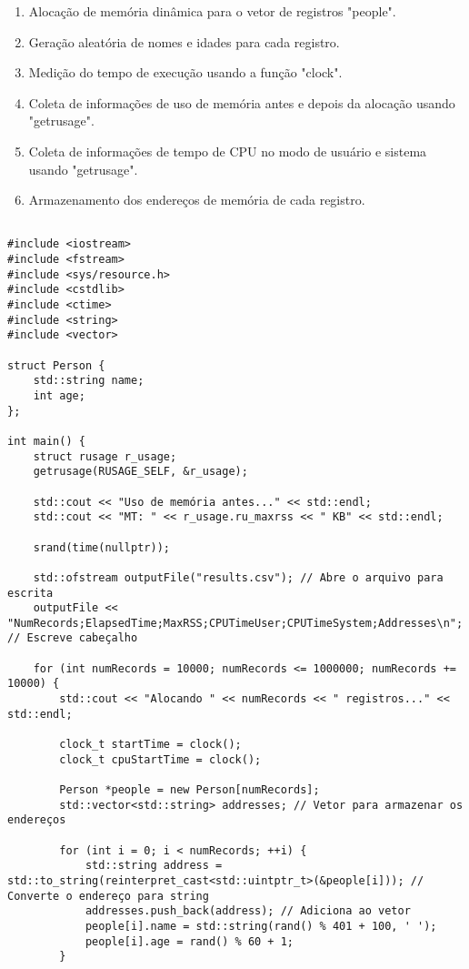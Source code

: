 \documentclass[a2paper,12pt]{article}
\begin{document}
\begin{enumerate}
    \item Alocação de memória dinâmica para o vetor de registros "people".
    \item Geração aleatória de nomes e idades para cada registro.
    \item Medição do tempo de execução usando a função "clock".
    \item Coleta de informações de uso de memória antes e depois da alocação usando "getrusage".
    \item Coleta de informações de tempo de CPU no modo de usuário e sistema usando "getrusage".
    \item Armazenamento dos endereços de memória de cada registro.
\end{enumerate}
\begin{lstlisting}

#include <iostream>
#include <fstream>
#include <sys/resource.h>
#include <cstdlib>
#include <ctime>
#include <string>
#include <vector>

struct Person {
    std::string name;
    int age;
};

int main() {
    struct rusage r_usage;
    getrusage(RUSAGE_SELF, &r_usage);

    std::cout << "Uso de memória antes..." << std::endl;
    std::cout << "MT: " << r_usage.ru_maxrss << " KB" << std::endl;

    srand(time(nullptr));

    std::ofstream outputFile("results.csv"); // Abre o arquivo para escrita
    outputFile << "NumRecords;ElapsedTime;MaxRSS;CPUTimeUser;CPUTimeSystem;Addresses\n"; // Escreve cabeçalho

    for (int numRecords = 10000; numRecords <= 1000000; numRecords += 10000) {
        std::cout << "Alocando " << numRecords << " registros..." << std::endl;

        clock_t startTime = clock();
        clock_t cpuStartTime = clock();

        Person *people = new Person[numRecords];
        std::vector<std::string> addresses; // Vetor para armazenar os endereços

        for (int i = 0; i < numRecords; ++i) {
            std::string address = std::to_string(reinterpret_cast<std::uintptr_t>(&people[i])); // Converte o endereço para string
            addresses.push_back(address); // Adiciona ao vetor
            people[i].name = std::string(rand() % 401 + 100, ' ');
            people[i].age = rand() % 60 + 1;
        }


\end{lstlisting}
\end{document}

